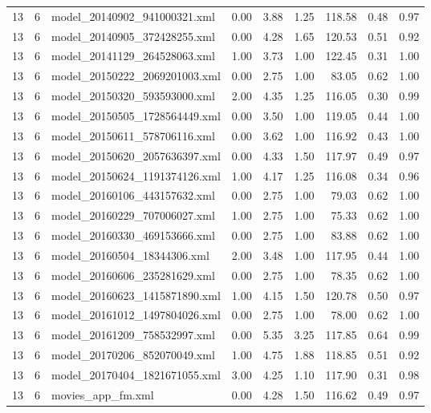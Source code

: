 \begin{table}[ht]
\begin{tabular}{rrlrrrrrr}
   13 &   6 & model\_20140902\_941000321.xml & 0.00 & 3.88 & 1.25 & 118.58 & 0.48 & 0.97 \\ 
   13 &   6 & model\_20140905\_372428255.xml & 0.00 & 4.28 & 1.65 & 120.53 & 0.51 & 0.92 \\ 
   13 &   6 & model\_20141129\_264528063.xml & 1.00 & 3.73 & 1.00 & 122.45 & 0.31 & 1.00 \\ 
   13 &   6 & model\_20150222\_2069201003.xml & 0.00 & 2.75 & 1.00 & 83.05 & 0.62 & 1.00 \\ 
   13 &   6 & model\_20150320\_593593000.xml & 2.00 & 4.35 & 1.25 & 116.05 & 0.30 & 0.99 \\ 
   13 &   6 & model\_20150505\_1728564449.xml & 0.00 & 3.50 & 1.00 & 119.05 & 0.44 & 1.00 \\ 
   13 &   6 & model\_20150611\_578706116.xml & 0.00 & 3.62 & 1.00 & 116.92 & 0.43 & 1.00 \\ 
   13 &   6 & model\_20150620\_2057636397.xml & 0.00 & 4.33 & 1.50 & 117.97 & 0.49 & 0.97 \\ 
   13 &   6 & model\_20150624\_1191374126.xml & 1.00 & 4.17 & 1.25 & 116.08 & 0.34 & 0.96 \\ 
   13 &   6 & model\_20160106\_443157632.xml & 0.00 & 2.75 & 1.00 & 79.03 & 0.62 & 1.00 \\ 
   13 &   6 & model\_20160229\_707006027.xml & 1.00 & 2.75 & 1.00 & 75.33 & 0.62 & 1.00 \\ 
   13 &   6 & model\_20160330\_469153666.xml & 0.00 & 2.75 & 1.00 & 83.88 & 0.62 & 1.00 \\ 
   13 &   6 & model\_20160504\_18344306.xml & 2.00 & 3.48 & 1.00 & 117.95 & 0.44 & 1.00 \\ 
   13 &   6 & model\_20160606\_235281629.xml & 0.00 & 2.75 & 1.00 & 78.35 & 0.62 & 1.00 \\ 
   13 &   6 & model\_20160623\_1415871890.xml & 1.00 & 4.15 & 1.50 & 120.78 & 0.50 & 0.97 \\ 
   13 &   6 & model\_20161012\_1497804026.xml & 0.00 & 2.75 & 1.00 & 78.00 & 0.62 & 1.00 \\ 
   13 &   6 & model\_20161209\_758532997.xml & 0.00 & 5.35 & 3.25 & 117.85 & 0.64 & 0.99 \\ 
   13 &   6 & model\_20170206\_852070049.xml & 1.00 & 4.75 & 1.88 & 118.85 & 0.51 & 0.92 \\ 
   13 &   6 & model\_20170404\_1821671055.xml & 3.00 & 4.25 & 1.10 & 117.90 & 0.31 & 0.98 \\ 
   13 &   6 & movies\_app\_fm.xml & 0.00 & 4.28 & 1.50 & 116.62 & 0.49 & 0.97 \\ 

\end{tabular}
\end{table}
